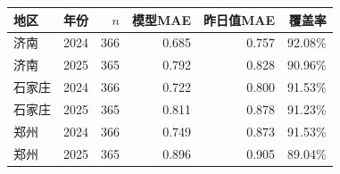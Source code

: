 \begin{tabular}{llrrrr}
\toprule
地区 & 年份 & $n$ & 模型MAE & 昨日值MAE & 覆盖率 \\
\midrule
济南 & 2024 & 366 & 0.685 & 0.757 & 92.08\% \\
济南 & 2025 & 365 & 0.792 & 0.828 & 90.96\% \\
石家庄 & 2024 & 366 & 0.722 & 0.800 & 91.53\% \\
石家庄 & 2025 & 365 & 0.811 & 0.878 & 91.23\% \\
郑州 & 2024 & 366 & 0.749 & 0.873 & 91.53\% \\
郑州 & 2025 & 365 & 0.896 & 0.905 & 89.04\% \\
\bottomrule
\end{tabular}